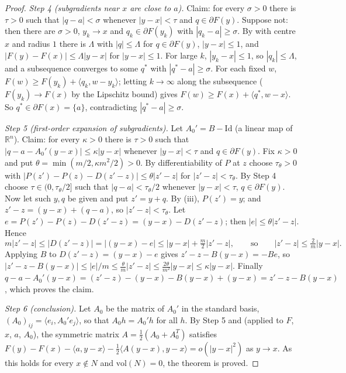 \begin{proof}
\emph{Step 4 (subgradients near $x$ are close to $a$).} Claim: for every $\sigma>0$ there is $\tau>0$ such that $|q-a|<\sigma$ whenever $|y-x|<\tau$ and $q\in\partial F(y)$. Suppose not: then there are $\sigma>0$, $y_k\to x$ and $q_k\in\partial F(y_k)$ with $|q_k-a|\ge\sigma$. By  with centre $x$ and radius $1$ there is $\Lambda$ with $|q|\le\Lambda$ for $q\in\partial F(y)$, $|y-x|\le1$, and $|F(y)-F(x)|\le\Lambda|y-x|$ for $|y-x|\le1$. For large $k$, $|y_k-x|\le1$, so $|q_k|\le\Lambda$, and a subsequence converges to some $q^*$ with $|q^*-a|\ge\sigma$. For each fixed $w$, $F(w)\ge F(y_k)+\langle q_k,w-y_k\rangle$; letting $k\to\infty$ along the subsequence ($F(y_k)\to F(x)$ by the Lipschitz bound) gives $F(w)\ge F(x)+\langle q^*,w-x\rangle$. So $q^*\in\partial F(x)=\{a\}$, contradicting $|q^*-a|\ge\sigma$.

\emph{Step 5 (first-order expansion of subgradients).} Let $A_0'=B-\mathrm{Id}$ (a linear map of $\mathbb R^n$). Claim: for every $\kappa>0$ there is $\tau>0$ such that $|q-a-A_0'(y-x)|\le\kappa|y-x|$ whenever $|y-x|<\tau$ and $q\in\partial F(y)$. Fix $\kappa>0$ and put $\theta=\min(m/2,\kappa m^2/2)>0$. By differentiability of $P$ at $z$ choose $\tau_\theta>0$ with $|P(z')-P(z)-D(z'-z)|\le\theta|z'-z|$ for $|z'-z|<\tau_\theta$. By Step 4 choose $\tau\in(0,\tau_\theta/2]$ such that $|q-a|<\tau_\theta/2$ whenever $|y-x|<\tau$, $q\in\partial F(y)$. Now let such $y,q$ be given and put $z'=y+q$. By (iii), $P(z')=y$; and $z'-z=(y-x)+(q-a)$, so $|z'-z|<\tau_\theta$. Let $e=P(z')-P(z)-D(z'-z)=(y-x)-D(z'-z)$; then $|e|\le\theta|z'-z|$. Hence
\[
m|z'-z|\le|D(z'-z)|=|(y-x)-e|\le|y-x|+\tfrac m2|z'-z|,\qquad\text{so}\qquad|z'-z|\le\tfrac2m|y-x| .
\]
Applying $B$ to $D(z'-z)=(y-x)-e$ gives $z'-z-B(y-x)=-Be$, so $|z'-z-B(y-x)|\le|e|/m\le\frac\theta m|z'-z|\le\frac{2\theta}{m^2}|y-x|\le\kappa|y-x|$. Finally $q-a-A_0'(y-x)=(z'-z)-(y-x)-B(y-x)+(y-x)=z'-z-B(y-x)$, which proves the claim.

\emph{Step 6 (conclusion).} Let $A_0$ be the matrix of $A_0'$ in the standard basis, $(A_0)_{ij}=\langle e_i,A_0'e_j\rangle$, so that $A_0h=A_0'h$ for all $h$. By Step 5 and  (applied to $F$, $x$, $a$, $A_0$), the symmetric matrix $A=\frac12(A_0+A_0^T)$ satisfies $F(y)-F(x)-\langle a,y-x\rangle-\frac12\langle A(y-x),y-x\rangle=o(|y-x|^2)$ as $y\to x$. As this holds for every $x\notin N$ and $\mathrm{vol}(N)=0$, the theorem is proved.
\end{proof}

